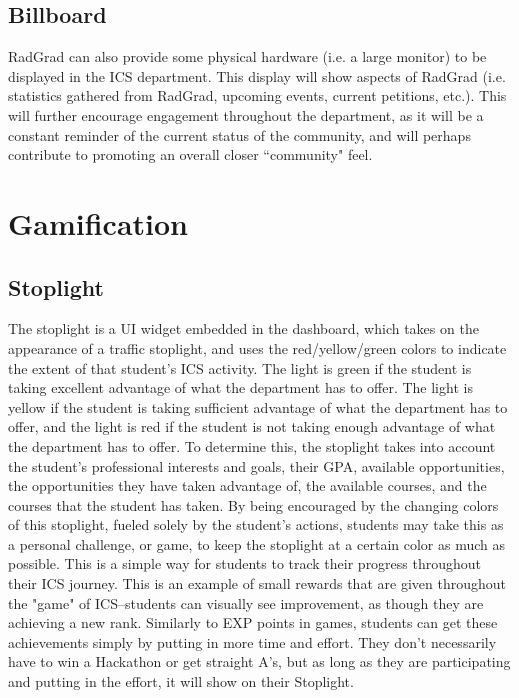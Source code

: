 \subsection{Billboard}
RadGrad can also provide some physical hardware (i.e. a large monitor) to be displayed in the ICS department. This display will show aspects of RadGrad (i.e. statistics gathered from RadGrad, upcoming events, current petitions, etc.). This will further encourage engagement throughout the department, as it will be a constant reminder of the current status of the community, and will perhaps contribute to promoting an overall closer ``community" feel. 

\section{Gamification}
\subsection{Stoplight}
The stoplight is a UI widget embedded in the dashboard, which takes on the appearance of a traffic stoplight, and uses the red/yellow/green colors to indicate the extent of that student's ICS activity. The light is green if the student is taking excellent advantage of what the department has to offer. The light is yellow if the student is taking sufficient advantage of what the department has to offer, and the light is red if the student is not taking enough advantage of what the department has to offer. To determine this, the stoplight takes into account the student's professional interests and goals, their GPA, available opportunities, the opportunities they have taken advantage of, the available courses, and the courses that the student has taken. By being encouraged by the changing colors of this stoplight, fueled solely by the student's actions, students may take this as a personal challenge, or game, to keep the stoplight at a certain color as much as possible. This is a simple way for students to track their progress throughout their ICS journey. This is an example of small rewards that are given throughout the "game" of ICS--students can visually see improvement, as though they are achieving a new rank. Similarly to EXP points in games, students can get these achievements simply by putting in more time and effort. They don't necessarily have to win a Hackathon or get straight A's, but as long as they are participating and putting in the effort, it will show on their Stoplight. 

